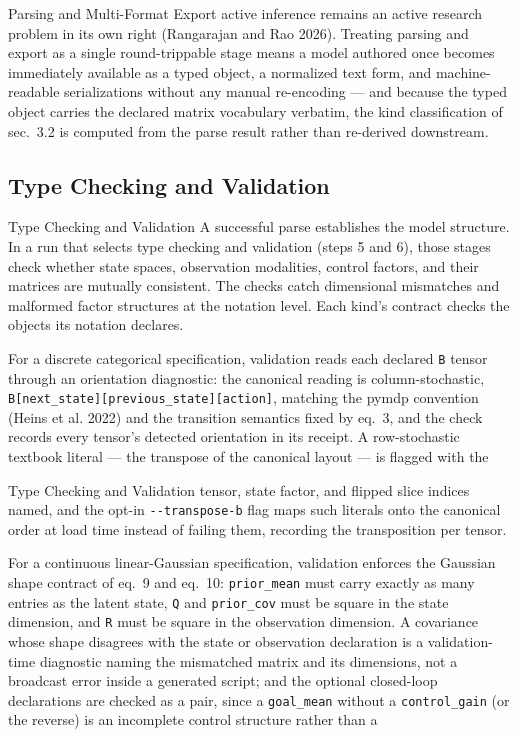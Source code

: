 \documentclass[
  ignorenonframetext,
]{beamer}
\begin{document}
\begin{frame}[allowframebreaks]{Parsing and Multi-Format Export}
active inference remains an active research problem in its own right
(Rangarajan and Rao 2026). Treating parsing and export as a single
round-trippable stage means a model authored once becomes immediately
available as a typed object, a normalized text form, and
machine-readable serializations without any manual re-encoding --- and
because the typed object carries the declared matrix vocabulary
verbatim, the kind classification of sec.~3.2 is
computed from the parse result rather than re-derived downstream.
\end{frame}

\subsection{Type Checking and
Validation}\label{type-checking-and-validation}

\begin{frame}{Type Checking and Validation}
A successful parse establishes the model structure. In a run that
selects type checking and validation (steps 5 and 6), those stages check
whether state spaces, observation modalities, control factors, and their
matrices are mutually consistent. The checks catch dimensional
mismatches and malformed factor structures at the notation level. Each
kind's contract checks the objects its notation declares.

For a discrete categorical specification, validation reads each declared
\texttt{B} tensor through an orientation diagnostic: the canonical
reading is column-stochastic,
\texttt{B{[}next\_state{]}{[}previous\_state{]}{[}action{]}}, matching
the pymdp convention (Heins et al. 2022) and the transition semantics
fixed by eq.~3, and the check records every tensor's
detected orientation in its receipt. A row-stochastic textbook literal
--- the transpose of the canonical layout --- is flagged with the
\end{frame}

\begin{frame}{Type Checking and Validation}
tensor, state factor, and flipped slice indices named, and the opt-in
\texttt{-\/-transpose-b} flag maps such literals onto the canonical
order at load time instead of failing them, recording the transposition
per tensor.

For a continuous linear-Gaussian specification, validation enforces the
Gaussian shape contract of eq.~9 and
eq.~10: \texttt{prior\_mean} must carry exactly as many
entries as the latent state, \texttt{Q} and \texttt{prior\_cov} must be
square in the state dimension, and \texttt{R} must be square in the
observation dimension. A covariance whose shape disagrees with the state
or observation declaration is a validation-time diagnostic naming the
mismatched matrix and its dimensions, not a broadcast error inside a
generated script; and the optional closed-loop declarations are checked
as a pair, since a \texttt{goal\_mean} without a \texttt{control\_gain}
(or the reverse) is an incomplete control structure rather than a
\end{frame}
\end{document}

